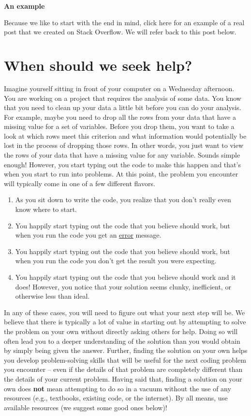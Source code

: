 \documentclass[
  letterpaper,
  DIV=11,
  numbers=noendperiod]{scrreprt}
\begin{document}
\textbf{An example}

Because we like to start with the end in mind, click here for an example
of a real post that we created on Stack Overflow. We will refer back to
this post below.

\section{When should we seek help?}\label{when-should-we-seek-help}

Imagine yourself sitting in front of your computer on a Wednesday
afternoon. You are working on a project that requires the analysis of
some data. You know that you need to clean up your data a little bit
before you can do your analysis. For example, maybe you need to drop all
the rows from your data that have a missing value for a set of
variables. Before you drop them, you want to take a look at which rows
meet this criterion and what information would potentially be lost in
the process of dropping those rows. In other words, you just want to
view the rows of your data that have a missing value for any variable.
Sounds simple enough! However, you start typing out the code to make
this happen and that's when you start to run into problems. At this
point, the problem you encounter will typically come in one of a few
different flavors.

\begin{enumerate}
\def\labelenumi{\arabic{enumi}.}
\item
  As you sit down to write the code, you realize that you don't really
  even know where to start.
\item
  You happily start typing out the code that you believe should work,
  but when you run the code you get an \hyperref[errors]{error} message.
\item
  You happily start typing out the code that you believe should work,
  but when you run the code you don't get the result you were expecting.
\item
  You happily start typing out the code that you believe should work and
  it does! However, you notice that your solution seems clunky,
  inefficient, or otherwise less than ideal.
\end{enumerate}

In any of these cases, you will need to figure out what your next step
will be. We believe that there is typically a lot of value in starting
out by attempting to solve the problem on your own without directly
asking others for help. Doing so will often lead you to a deeper
understanding of the solution than you would obtain by simply being
given the answer. Further, finding the solution on your own helps you
develop problem-solving skills that will be useful for the next coding
problem you encounter -- even if the details of that problem are
completely different than the details of your current problem. Having
said that, finding a solution on your own does \textbf{not} mean
attempting to do so in a vacuum without the use of any resources (e.g.,
textbooks, existing code, or the internet). By all means, use available
resources (we suggest some good ones below)!
\end{document}
